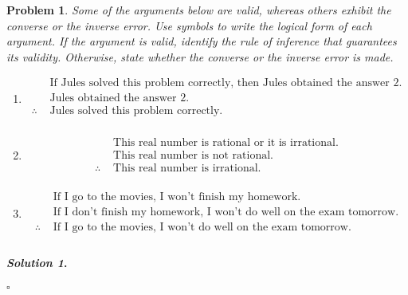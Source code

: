 \documentclass{amsart}
\theoremstyle{plain}
\newtheorem{problem}{Problem}
\newenvironment{solution}{\paragraph{\emph{Solution 1}.}}{\hfill$\square$}
\begin{document}
\begin{problem}
Some of the arguments below are valid, whereas others exhibit the converse or the inverse error.  Use symbols to write the logical form of each argument.  If the argument is valid, identify the rule of inference that guarantees its validity.  Otherwise, state whether the converse or the inverse error is made.
\begin{enumerate}
\item 
\begin{equation*}
\begin{aligned}
& \, \, \text{If Jules solved this problem correctly, then Jules obtained the answer }2. \\
& \, \, \text{Jules obtained the answer }2. \\
\therefore &\,\, \text{Jules solved this problem correctly.} \\
\end{aligned}
\end{equation*}
\item
\begin{equation*}
\begin{aligned}
& \, \, \text{This real number is rational or it is irrational.} \\
& \, \, \text{This real number is not rational.} \\
\therefore &\,\, \text{This real number is irrational.} \\
\end{aligned}
\end{equation*}
\item
\begin{equation*}
\begin{aligned}
& \, \, \text{If I go to the movies, I won't finish my homework.} \\
& \, \, \text{If I don't finish my homework, I won't do well on the exam tomorrow.} \\
\therefore &\,\, \text{If I go to the movies, I won't do well on the exam tomorrow.} \\
\end{aligned}
\end{equation*}
\end{enumerate}
\end{problem}

\begin{solution}

\end{solution}
\end{document}

